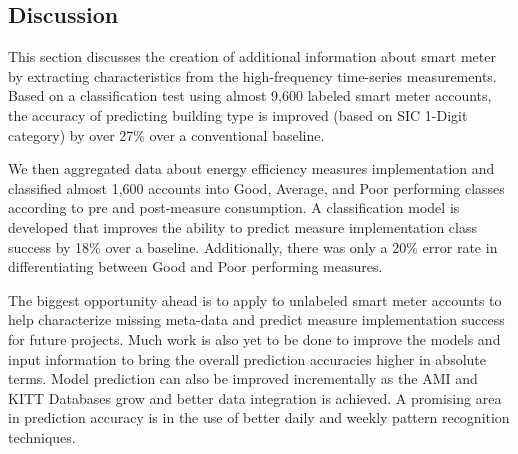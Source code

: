\subsection{Discussion}
\label{sec:scalabilitydiscussion}

This section discusses the creation of additional information about smart meter by extracting characteristics from the high-frequency time-series measurements. Based on a classification test using almost 9,600 labeled smart meter accounts, the accuracy of predicting building type is improved (based on SIC 1-Digit category) by over 27\% over a conventional baseline. 

We then aggregated data about energy efficiency measures implementation and classified almost 1,600 accounts into Good, Average, and Poor performing classes according to pre and post-measure consumption. A classification model is developed that improves the ability to predict measure implementation class success by 18\% over a baseline. Additionally, there was only a 20\% error rate in differentiating between Good and Poor performing measures.

The biggest opportunity ahead is to apply to unlabeled smart meter accounts to help characterize missing meta-data and predict measure implementation success for future projects. Much work is also yet to be done to improve the models and input information to bring the overall prediction accuracies higher in absolute terms. Model prediction can also be improved incrementally as the AMI and KITT Databases grow and better data integration is achieved. A promising area in prediction accuracy is in the use of better daily and weekly pattern recognition techniques.



